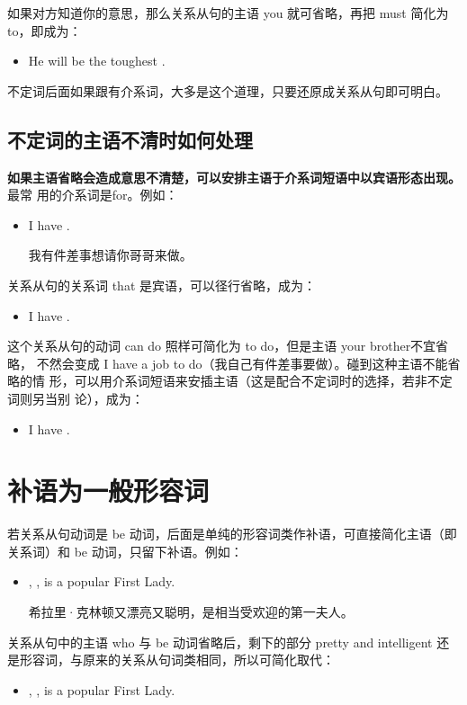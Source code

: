 如果对方知道你的意思，那么关系从句的主语 you 就可省略，再把 must 简化为
to，即成为：
\begin{itemize}
\item He will be the toughest  .
\end{itemize}

不定词后面如果跟有介系词，大多是这个道理，只要还原成关系从句即可明白。

\subsection{不定词的主语不清时如何处理}

\textbf{如果主语省略会造成意思不清楚，可以安排主语于介系词短语中以宾语形态出现。}最常
用的介系词是for。例如：
\begin{itemize}
\item I have  .

  我有件差事想请你哥哥来做。
\end{itemize}
关系从句的关系词 that 是宾语，可以径行省略，成为：
\begin{itemize}
\item I have  .
\end{itemize}
这个关系从句的动词 can do 照样可简化为 to do，但是主语 your brother不宜省略，
不然会变成 I have a job to do（我自己有件差事要做）。碰到这种主语不能省略的情
形，可以用介系词短语来安插主语（这是配合不定词时的选择，若非不定词则另当别
论），成为：
\begin{itemize}
\item I have  .
\end{itemize}

\section{补语为一般形容词}

若关系从句动词是 be
动词，后面是单纯的形容词类作补语，可直接简化主语（即关系词）和 be
动词，只留下补语。例如：

\begin{itemize}
\item {}, , is a popular First Lady.

  希拉里·克林顿又漂亮又聪明，是相当受欢迎的第一夫人。
\end{itemize}
关系从句中的主语 who 与 be 动词省略后，剩下的部分 pretty and intelligent
还是形容词，与原来的关系从句词类相同，所以可简化取代：
\begin{itemize}
\item {}, , is a popular First Lady.
\end{itemize}

